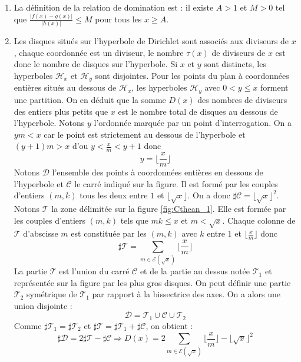 \begin{enumerate}
 \item La définition de la relation de domination est : il existe $A>1$ et $M>0$ tel que $\frac{|f(x)-g(x)|}{|h(x)|}\leq M$ pour tous les $x\geq A$.
 
\item Les disques situés sur l'hyperbole de Dirichlet sont associés aux diviseurs de $x$, chaque coordonnée est un diviseur, le nombre $\tau(x)$ de diviseurs de $x$ est donc le nombre de disques sur l'hyperbole. Si $x$ et $y$ sont distincts, les hyperboles $\mathcal{H}_x$ et $\mathcal{H}_y$ sont disjointes. Pour les points du plan à coordonnées entières situés au dessous de $\mathcal{H}_x$, les hyperboles $\mathcal{H}_y$ avec $0<y\leq x$ forment une partition. On en déduit que la somme $D(x)$ des nombres de diviseurs des entiers plus petits que $x$ est le nombre total de disques au dessous de l'hyperbole.\newline
Notons $y$ l'ordonnée marquée par un point d'interrogation. On a $ym<x$ car le point est strictement au dessous de l'hyperbole et $(y+1)m>x$ d'ou $y<\frac{x}{m}<y+1$ donc
\begin{displaymath}
 y=\lfloor\frac{x}{m}\rfloor
\end{displaymath}
Notons $\mathcal D$ l'ensemble des points à coordonnées entières en dessous de l'hyperbole et $\mathcal C$ le carré indiqué sur la figure. Il est formé par les couples d'entiers $(m,k)$ tous les deux entre $1$ et $\lfloor\sqrt{x}\rfloor$. On a donc $\sharp \mathcal C = \lfloor\sqrt{x}\rfloor^2$.\newline
Notons $\mathcal T$ la zone délimitée sur la figure \ref{fig:Cthean_1}. Elle est formée par les couples d'entiers $(m,k)$ tels que $mk\leq x$ et $m<\sqrt{x}$. Chaque colonne de $\mathcal T$ d'abscisse $m$ est constituée par les $(m,k)$ avec $k$ entre $1$ et $\lfloor\frac{x}{m}\rfloor$ donc
\begin{displaymath}
 \sharp \mathcal T = \sum_{m\in \mathcal E(\sqrt{x})}\lfloor\frac{x}{m}\rfloor
\end{displaymath}
La partie $\mathcal T$ est l'union du carré $\mathcal C$ et de la partie au dessus notée $\mathcal T_1$ et représentée sur la figure par les plus gros disques. On peut définir une partie $\mathcal T_2$ symétrique de $\mathcal T_1$ par rapport à la bissectrice des axes. On a alors une union disjointe :
\begin{displaymath}
 \mathcal D = \mathcal T_1 \cup \mathcal C \cup \mathcal T_2
\end{displaymath}
Comme $\sharp \mathcal T_1=\sharp \mathcal T_2$ et $\sharp\mathcal T = \sharp \mathcal T_1 +\sharp \mathcal C$, on obtient :
\begin{displaymath}
 \sharp \mathcal D = 2\sharp \mathcal T - \sharp \mathcal C
\Rightarrow D(x) = 2\sum_{m\in \mathcal E(\sqrt{x})}\lfloor\frac{x}{m}\rfloor - \lfloor\sqrt{x}\rfloor^2
\end{displaymath}


\end{enumerate}
